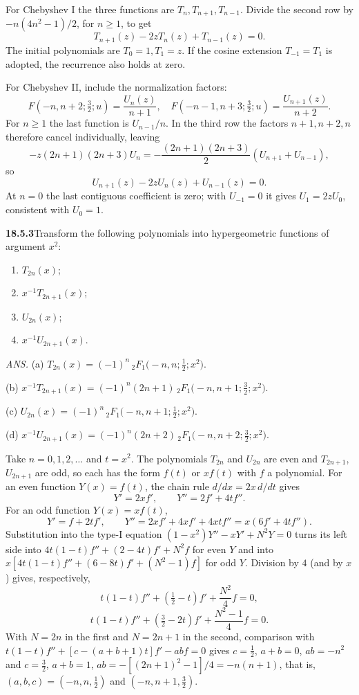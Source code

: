 For Chebyshev I the three functions are $T_n,T_{n+1},T_{n-1}$.
Divide the second row by $-n(4n^2-1)/2$, for $n\ge1$, to get
\[
\boxed{T_{n+1}(z)-2zT_n(z)+T_{n-1}(z)=0}.
\]
The initial polynomials are $T_0=1,T_1=z$.  If the cosine
extension $T_{-1}=T_1$ is adopted, the recurrence also holds at zero.

For Chebyshev II, include the normalization factors:
\[
F(-n,n+2;\tfrac32;u)=\frac{U_n(z)}{n+1},\quad
F(-n-1,n+3;\tfrac32;u)=\frac{U_{n+1}(z)}{n+2}.
\]
For $n\ge1$ the last function is $U_{n-1}/n$.  In the third
row the factors $n+1,n+2,n$ therefore cancel individually, leaving
\[
-z(2n+1)(2n+3)U_n
=-\frac{(2n+1)(2n+3)}2(U_{n+1}+U_{n-1}),
\]
so
\[
\boxed{U_{n+1}(z)-2zU_n(z)+U_{n-1}(z)=0}.
\]
At $n=0$ the last contiguous coefficient is zero; with $U_{-1}=0$
it gives $U_1=2zU_0$, consistent with $U_0=1$.

\par\bigskip
\noindent\textbf{18.5.3}\quad Transform the following polynomials
into hypergeometric functions of argument $x^{2}$:
\begin{enumerate}
\item[(a)] $T_{2n}(x)$;
\item[(b)] $x^{-1}T_{2n+1}(x)$;
\item[(c)] $U_{2n}(x)$;
\item[(d)] $x^{-1}U_{2n+1}(x)$.
\end{enumerate}
\par\nobreak\hfill\emph{ANS.}\enspace
(a) $T_{2n}(x)=(-1)^{n}\,{}_{2}F_{1}\big(-n,n;\tfrac{1}{2};
x^{2}\big)$.\par\nobreak
\hfill(b) $x^{-1}T_{2n+1}(x)=(-1)^{n}(2n+1)\,
{}_{2}F_{1}\big(-n,n+1;\tfrac{3}{2};x^{2}\big)$.\par\nobreak
\hfill(c) $U_{2n}(x)=(-1)^{n}\,{}_{2}F_{1}\big(-n,n+1;\tfrac{1}{2};
x^{2}\big)$.\par\nobreak
\hfill(d) $x^{-1}U_{2n+1}(x)=(-1)^{n}(2n+2)\,
{}_{2}F_{1}\big(-n,n+2;\tfrac{3}{2};x^{2}\big)$.\par\nobreak
{}\par\nobreak
\solution
Take $n=0,1,2,\ldots$ and $t=x^2$.  The polynomials $T_{2n}$ and
$U_{2n}$ are even and $T_{2n+1}$, $U_{2n+1}$ are odd, so each has
the form $f(t)$ or $xf(t)$ with $f$ a polynomial.  For an even
function $Y(x)=f(t)$, the chain rule $d/dx=2x\,d/dt$ gives
\[
Y'=2xf',\qquad Y''=2f'+4tf''.
\]
For an odd function $Y(x)=xf(t)$,
\[
Y'=f+2tf',\qquad Y''=2xf'+4xf'+4xtf''=x(6f'+4tf'').
\]
Substitution into the type-I equation
$(1-x^2)Y''-xY'+N^2Y=0$ turns its left side into
$4t(1-t)f''+(2-4t)f'+N^2f$ for even $Y$ and into
$x[4t(1-t)f''+(6-8t)f'+(N^2-1)f]$ for odd $Y$.
Division by $4$ (and by $x$) gives, respectively,
\[
t(1-t)f''+(\tfrac12-t)f'+\frac{N^2}{4}f=0,
\]
\[
t(1-t)f''+(\tfrac32-2t)f'+\frac{N^2-1}{4}f=0.
\]
With $N=2n$ in the first and $N=2n+1$ in the second, comparison
with $t(1-t)f''+[c-(a+b+1)t]f'-abf=0$ gives $c=\tfrac12$, $a+b=0$,
$ab=-n^2$ and $c=\tfrac32$, $a+b=1$, $ab=-[(2n+1)^2-1]/4=-n(n+1)$,
that is, $(a,b,c)=(-n,n,\tfrac12)$ and $(-n,n+1,\tfrac32)$.

